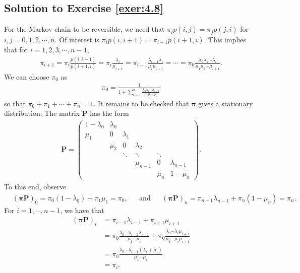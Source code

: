 \documentclass[12pt]{book}
\numberwithin{equation}{chapter}
\theoremstyle{plain}
\numberwithin{theorem}{section}
\theoremstyle{definition}
\numberwithin{exercise}{chapter}
\newcommand{\<}{\langle}
\renewcommand{\>}{\rangle}
\renewcommand{\(}{\left(}
\renewcommand{\)}{\right)}
\renewcommand{\[}{\left[}
\renewcommand{\]}{\right]}
\newcommand\Pv{\pmb{P}}
\newcommand\piv{\pmb{\pi}}
\begin{document}
\subsection*{Solution to Exercise \ref{exer:4.8}}
For the Markov chain to be reversible, we need that $\pi_{i} p(i,j) = \pi_j p(j,i)$ for $i,j = 0,1,2,\cdots,n$. Of 
interest is $\pi_i p(i,i+1) = \pi_{i+1} p(i+1,i)$. This implies that for $i = 1,2,3,\cdots,n-1$,
\begin{align}
\pi_{i+1} 
	= \pi_i \frac{p(i,i+1)}{p(i+1,i)}
	= \pi_{i}\frac{\lambda_i}{\mu_{i+1}}
	= \pi_{i-1} \frac{\lambda_{i-1}\lambda_i}{\mu_i \mu_{i+1}}
	= \cdots
	= \pi_0 \frac{\lambda_0 \lambda_1 \cdots \lambda_{i}}{\mu_1 \mu_2 \cdots \mu_{i+1}}.
\end{align}
We can choose $\pi_0$ as
\begin{align}
\pi_0
	= \frac{1}{1 + \sum_{i = 1}^{n} \frac{\lambda_0 \lambda_1 \cdots \lambda_{i-1}}{\mu_1 \mu_2 \cdots \mu_{i}}}
\end{align}
so that $\pi_0 + \pi_1 + \cdots + \pi_n = 1$. It remains to be checked that $\piv$ gives a stationary distribution. 
The matrix $\Pv$ has the form
\begin{align}
\Pv
	=
\begin{pmatrix}
1 - \lambda_0 & \lambda_0 \\
\mu_1 & 0 & \lambda_1 \\
 & \mu_2 & 0 & \lambda_2 \\
 & & \ddots & \ddots & \ddots \\
 & & & \mu_{n-1} & 0 & \lambda_{n-1} \\
 & & & & \mu_n & 1- \mu_n
\end{pmatrix}.
\end{align}
To this end, observe
\begin{align}
&(\piv \Pv)_0
	= \pi_0 ( 1- \lambda_0) + \pi_1 \mu_1 
	= \pi_0,
&&\text{and}
&& (\piv \Pv)_n
	= \pi_{n-1} \lambda_{n-1} + \pi_n (1 - \mu_n)
	= \pi_n.
\end{align}
For $i = 1,\cdots, n-1$, we have that
\begin{align}
(\piv \Pv)_i
	&= \pi_{i-1} \lambda_{i-1} + \pi_{i+1}\mu_{i+1} \\
	&= \pi_0 \frac{\lambda_0 \cdots \lambda_{i-2} \lambda_{i-1}}{\mu_1 \cdots \mu_{i}}
		+ \pi_0 \frac{\lambda_0 \cdots  \lambda_{i} \mu_{i+1}}{\mu_1 \cdots \mu_{i}\mu_{i+1}} \\
	&= \pi_0 \frac{ \lambda_0 \cdots \lambda_{i-1} ( \lambda_i + \mu_i) }{\mu_1 \cdots \mu_i }\\
	&= \pi_i.
\end{align}
\end{document}
